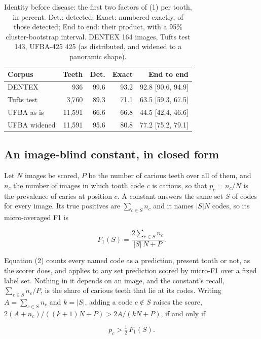 \documentclass[conference]{IEEEtran}
\begin{document}
\begin{table}[t]
\centering
\caption{Identity before disease: the first two factors of (1) per tooth, in percent. Det.: detected; Exact: numbered exactly, of those detected; End to end: their product, with a 95\% cluster-bootstrap interval. DENTEX 164 images, Tufts test 143, UFBA-425 425 (as distributed, and widened to a panoramic shape).}
\label{tab:1}
\footnotesize
\setlength{\tabcolsep}{3pt}
\begin{tabular}{>{\raggedright\arraybackslash}p{2.42cm}rrrr}
\toprule
Corpus & Teeth & Det. & Exact & End to end \\
\midrule
DENTEX & 936 & 99.6 & 93.2 & 92.8 [90.6, 94.9] \\
Tufts test & 3,760 & 89.3 & 71.1 & 63.5 [59.3, 67.5] \\
UFBA as is & 11,591 & 66.6 & 66.8 & 44.5 [42.4, 46.6] \\
UFBA widened & 11,591 & 95.6 & 80.8 & 77.2 [75.2, 79.1] \\
\bottomrule
\end{tabular}
\end{table}

\subsection{An image-blind constant, in closed form}

Let $N$ images be scored, $P$ be the number of carious teeth over all of them, and $n_c$ the number of images in which tooth code $c$ is carious, so that $p_c = n_c/N$ is the prevalence of caries at position $c$. A constant answers the same set $S$ of codes for every image. Its true positives are $\sum_{c \in S} n_c$ and it names $|S|N$ codes, so its micro-averaged F1 is

\begin{equation}
F_1(S) = \frac{2 \sum_{c \in S} n_c}{|S|\,N + P}.
\end{equation}

Equation (2) counts every named code as a prediction, present tooth or not, as the scorer does, and applies to any set prediction scored by micro-F1 over a fixed label set. Nothing in it depends on an image, and the constant's recall, $\sum_{c \in S} n_c / P$, is the share of carious teeth that lie at its codes. Writing $A = \sum_{c \in S} n_c$ and $k = |S|$, adding a code $c \notin S$ raises the score, $2(A+n_c)/((k+1)N+P) > 2A/(kN+P)$, if and only if

\begin{equation}
p_c > \tfrac{1}{2}\, F_1(S).
\end{equation}
\end{document}
